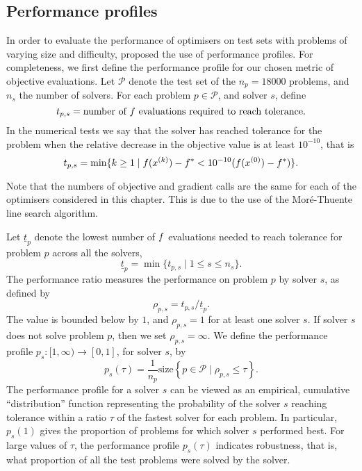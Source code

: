 \documentclass[main.tex]{subfiles}
\begin{document}
\subsection{Performance profiles}\label{subsec:perf_prof}
In order to evaluate the performance of optimisers on test sets with
problems of varying size and difficulty, \citet{dolan2002benchmarking}
proposed the use of performance profiles.  For completeness, we first
define the performance profile for our chosen metric of objective
evaluations.  Let $\mathcal{P}$ denote the test set of the
$n_p=\num{18000}$ problems, and $n_s$ the number of solvers.  For each
problem $p\in\mathcal{P}$, and solver $s$, define
\begin{equation}
  t_{p,s} = \text{number of $f$ evaluations required to reach
    tolerance.}
\end{equation}
In the numerical tests we say that the solver has reached tolerance
for the problem when the relative decrease in the objective value is
at least $10^{-10}$, that is
\begin{equation}\label{eq:def_performance_measure}
  t_{p,s} = \min\{k\geq 1 \mid f(x^{(k)})-f^* < 10^{-10}(f(x^{(0)})-f^*)\}.
\end{equation}
\begin{remark}
  Note that the numbers of objective and gradient calls are the same
  for each of the optimisers considered in this chapter. This is
  due to the use of the Mor\'{e}-Thuente line search algorithm.
\end{remark}

Let $\underline{t}_p$ denote the lowest number of $f$ evaluations
needed to reach tolerance for problem $p$ across all the solvers,
\begin{equation}
  \underline{t}_p=\min\{t_{p,s}\mid 1\leq s\leq n_s\}.
\end{equation}
The performance ratio measures the performance on problem $p$ by
solver $s$, as defined by
\begin{equation}
  \rho_{p,s}=t_{p,s}/\underline{t}_p.
\end{equation}
The value is bounded below by $1$, and $\rho_{p,s}=1$ for at least one
solver $s$.  If solver $s$ does not solve problem $p$, then we set
$\rho_{p,s}=\infty$.  We define the performance profile
$p_s:[1,\infty)\to[0,1]$, for solver $s$, by
\begin{equation}\label{eq:perf_profile}
  p_s(\tau) = \frac{1}{n_p}\mbox{size}\left\{p\in\mathcal{P}\mid \rho_{p,s}\leq \tau\right\}.
\end{equation}
The performance profile for a solver $s$ can be viewed as an
empirical, cumulative ``distribution'' function representing the
probability of the solver $s$ reaching tolerance within a ratio $\tau$
of the fastest solver for each problem.  In particular, $p_s(1)$ gives
the proportion of problems for which solver $s$ performed best. For
large values of $\tau$, the performance profile $p_s(\tau)$ indicates
robustness, that is, what proportion of all the test problems were
solved by the solver.
\end{document}
